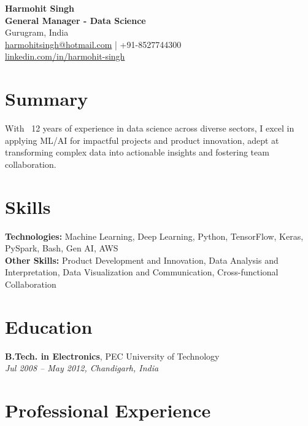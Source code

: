 \documentclass[a4paper,10pt]{article}
\begin{document}
\begin{center}
    \textbf{\LARGE Harmohit Singh} \\
    \vspace{0.2em}
    \textbf{General Manager - Data Science} \\
    Gurugram, India \\
    \href{mailto:harmohitsingh@hotmail.com}{harmohitsingh@hotmail.com} \quad | \quad +91-8527744300 \\
    \href{https://linkedin.com/in/harmohit-singh}{linkedin.com/in/harmohit-singh}
\end{center}

\vspace{1em}

\section*{Summary}
With ~12 years of experience in data science across diverse sectors, I excel in applying ML/AI for impactful projects and product innovation, adept at transforming complex data into actionable insights and fostering team collaboration.

\section*{Skills}
\textbf{Technologies:} Machine Learning, Deep Learning, Python, TensorFlow, Keras, PySpark, Bash, Gen AI, AWS \\
\textbf{Other Skills:} Product Development and Innovation, Data Analysis and Interpretation, Data Visualization and Communication, Cross-functional Collaboration

\section*{Education}
\textbf{B.Tech. in Electronics}, PEC University of Technology \\
\textit{Jul 2008 – May 2012, Chandigarh, India}

\section*{Professional Experience}
\end{document}
